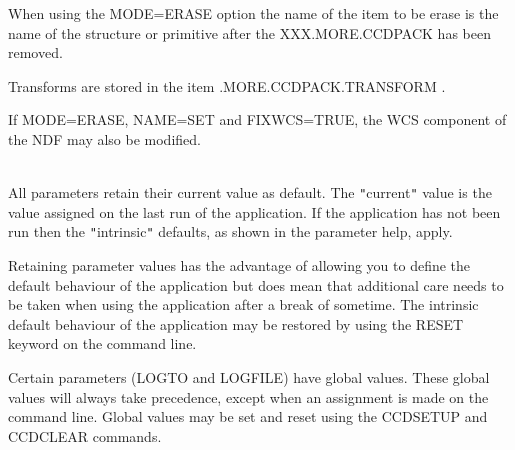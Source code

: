 \documentclass[twoside,11pt]{article}
\newcommand{\htmlref}[2]{#1}
\renewcommand{\_}{\texttt{\symbol{95}}}
\newcommand{\qt}[1]{{\tt "}#1{\tt "}}
\newcommand{\xroutine}[1]{\htmlref{{\sc #1}}{#1}}
\newcommand{\sstdiytopic}[2]{\item[#1:] \mbox{} \\[1.3ex] #2}
\newcommand{\sstitem}{\item}
\newcommand{\sstdiytopic}[2]{\item[{#1}] #2 }
\newcommand{\sstitem}{\item}
\begin{document}
{{{         \sstitem
         When using the MODE=ERASE option the name of the item to be
           erase is the name of the structure or primitive after the
           XXX.MORE.CCDPACK has been removed.

         \sstitem
         Transforms are stored in the item .MORE.CCDPACK.TRANSFORM .

         \sstitem
         If MODE=ERASE, NAME=SET and FIXWCS=TRUE, the WCS component
         of the NDF may also be modified.

      }
   }
   \sstdiytopic{
      Behaviour of parameters
   }{
      All parameters retain their current value as default. The
      \qt{current} value is the value assigned on the last run of the
      application. If the application has not been run then the
      \qt{intrinsic} defaults, as shown in the parameter help, apply.

      Retaining parameter values has the advantage of allowing you to
      define the default behaviour of the application but does mean
      that additional care needs to be taken when using the application
      after a break of sometime.  The intrinsic default behaviour of
      the application may be restored by using the RESET keyword on the
      command line.

      Certain parameters (LOGTO and LOGFILE) have global values. These
      global values will always take precedence, except when an
      assignment is made on the command line.  Global values may be set
      and reset using the \xroutine{CCDSETUP} and \xroutine{CCDCLEAR} commands.
   }
}
\end{document}
